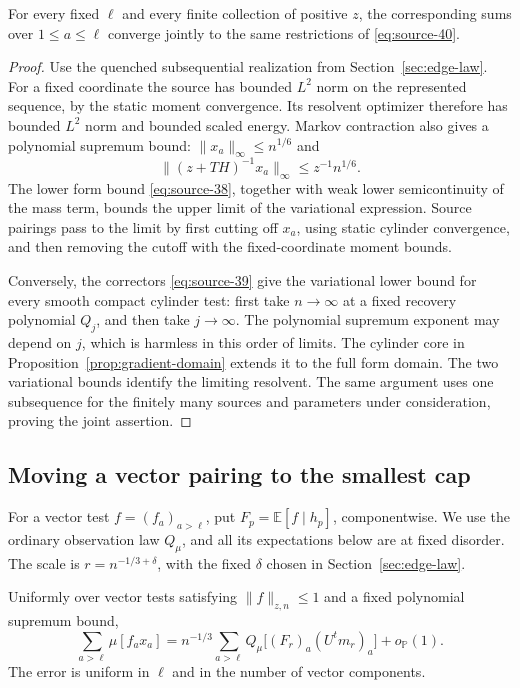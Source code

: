\begin{lemma}
\label{lem:trace-fixed}
For every fixed $\ell$ and every finite collection of positive $z$,
the corresponding sums over $1\leq a\leq\ell$ converge jointly to
the same restrictions of \eqref{eq:source-40}.
\end{lemma}

\begin{proof}
Use the quenched subsequential realization from
Section~\ref{sec:edge-law}.  For a fixed coordinate the source has
bounded $L^2$ norm on the represented sequence, by the static moment
convergence.  Its resolvent optimizer therefore has bounded $L^2$ norm
and bounded scaled energy.  Markov contraction also gives a polynomial
supremum bound: $\|x_a\|_\infty\leq n^{1/6}$ and
\[
 \|(z+TH)^{-1}x_a\|_\infty\leq z^{-1}n^{1/6}.
\]
The lower form bound \eqref{eq:source-38}, together with weak lower
semicontinuity of the mass term, bounds the upper limit of the
variational expression.  Source pairings pass to the limit by first
cutting off $x_a$, using static cylinder convergence, and then removing
the cutoff with the fixed-coordinate moment bounds.

Conversely, the correctors \eqref{eq:source-39} give the variational
lower bound for every smooth compact cylinder test: first take
$n\to\infty$ at a fixed recovery polynomial $Q_j$, and then take
$j\to\infty$.  The polynomial supremum exponent may depend on $j$,
which is harmless in this order of limits.  The cylinder core
in Proposition~\ref{prop:gradient-domain} extends it to the full form
domain.  The two variational bounds identify the limiting resolvent.
The same argument uses one subsequence for the finitely many sources
and parameters under consideration, proving the joint assertion.
\end{proof}

\subsection{Moving a vector pairing to the smallest cap}

For a vector test $f=(f_a)_{a>\ell}$, put
$F_p=\mathbb E[f\mid h_p]$, componentwise.  We use the ordinary
observation law $Q_\mu$, and all its expectations below are at fixed
disorder.  The scale is $r=n^{-1/3+\delta}$, with the fixed $\delta$
chosen in Section~\ref{sec:edge-law}.

\begin{lemma}
\label{lem:trace-replacement}
Uniformly over vector tests satisfying $\|f\|_{z,n}\leq1$ and a fixed
polynomial supremum bound,
\begin{equation}
 \sum_{a>\ell}\mu[f_ax_a]
 =n^{-1/3}\sum_{a>\ell}
 Q_\mu\big[(F_r)_a(U^tm_r)_a\big]+o_{\mathbb P}(1).
 \label{eq:source-41}
\end{equation}
The error is uniform in $\ell$ and in the number of vector components.
\end{lemma}

